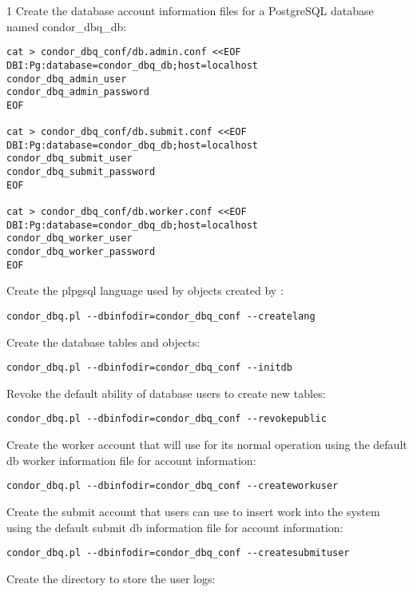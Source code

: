 \begin{ManPage}{\label{man-condor-dbq.pl}}{1}
Create the database account information files for a PostgreSQL database
named condor\_dbq\_db:

\begin{verbatim}
cat > condor_dbq_conf/db.admin.conf <<EOF
DBI:Pg:database=condor_dbq_db;host=localhost
condor_dbq_admin_user
condor_dbq_admin_password
EOF

cat > condor_dbq_conf/db.submit.conf <<EOF
DBI:Pg:database=condor_dbq_db;host=localhost
condor_dbq_submit_user
condor_dbq_submit_password
EOF

cat > condor_dbq_conf/db.worker.conf <<EOF
DBI:Pg:database=condor_dbq_db;host=localhost
condor_dbq_worker_user
condor_dbq_worker_password
EOF
\end{verbatim}

Create the plpgsql language used by objects created by :

\begin{verbatim}
condor_dbq.pl --dbinfodir=condor_dbq_conf --createlang
\end{verbatim}

Create the database tables and objects:

\begin{verbatim}
condor_dbq.pl --dbinfodir=condor_dbq_conf --initdb
\end{verbatim}

Revoke the default ability of database users to create new tables:

\begin{verbatim}
condor_dbq.pl --dbinfodir=condor_dbq_conf --revokepublic
\end{verbatim}

Create the worker account that  will use for its normal
operation using the default db worker information file for account information:

\begin{verbatim}
condor_dbq.pl --dbinfodir=condor_dbq_conf --createworkuser
\end{verbatim}

Create the submit account that users can use to insert work into the
system using the default submit db information file for account information:

\begin{verbatim}
condor_dbq.pl --dbinfodir=condor_dbq_conf --createsubmituser
\end{verbatim}

Create the directory to store the user logs:


\end{ManPage}
